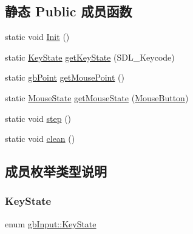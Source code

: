 \subsection*{静态 Public 成员函数}
\begin{DoxyCompactItemize}
\item 
static void \mbox{\hyperlink{classgb_input_a1c1bd55741717af5ab438340da8d6856}{Init}} ()
\item 
static \mbox{\hyperlink{classgb_input_af8c222f97119246c7b6e3c127a47a5bb}{Key\+State}} \mbox{\hyperlink{classgb_input_a6acdc1c4b53832139cf3d1cdf06061fe}{get\+Key\+State}} (S\+D\+L\+\_\+\+Keycode)
\item 
static \mbox{\hyperlink{classgb_point}{gb\+Point}} \mbox{\hyperlink{classgb_input_af55c74957fdc9148e331ff662c612c9d}{get\+Mouse\+Point}} ()
\item 
static \mbox{\hyperlink{classgb_input_adf80e0206ecdf62ba8c55e9d5ac9c290}{Mouse\+State}} \mbox{\hyperlink{classgb_input_accf6fe3ece1c770b30c83644ff6b473d}{get\+Mouse\+State}} (\mbox{\hyperlink{classgb_input_a8b92d031046a9cc8e432684fae3ee398}{Mouse\+Button}})
\item 
static void \mbox{\hyperlink{classgb_input_ac294faea739dc21a97cd651208bbeb29}{step}} ()
\item 
static void \mbox{\hyperlink{classgb_input_af19d729b885e2075024364310927e3b3}{clean}} ()
\end{DoxyCompactItemize}


\subsection{成员枚举类型说明}
\mbox{\label{classgb_input_af8c222f97119246c7b6e3c127a47a5bb}} 
\subsubsection{\texorpdfstring{KeyState}{KeyState}}
{\footnotesize\ttfamily enum \mbox{\hyperlink{classgb_input_af8c222f97119246c7b6e3c127a47a5bb}{gb\+Input\+::\+Key\+State}}}

